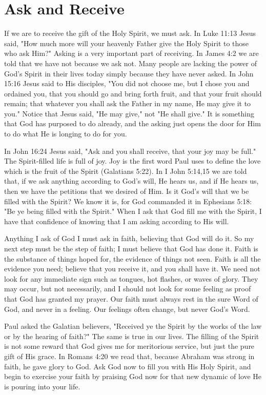 \section*{Ask and Receive}

If we are to receive the gift of the Holy Spirit, we must ask. In Luke 11:13 Jesus said, "How much more will your heavenly Father give the Holy Spirit to those who ask Him?" Asking is a very important part of receiving. In James 4:2 we are told that we have not because we ask not. Many people are lacking the power of God's Spirit in their lives today simply because they have never asked. In John 15:16 Jesus said to His disciples, "You did not choose me, but I chose you and ordained you, that you should go and bring forth fruit, and that your fruit should remain; that whatever you shall ask the Father in my name, He may give it to you." Notice that Jesus said, "He may give," not "He shall give." It is something that God has purposed to do already, and the asking just opens the door for Him to do what He is longing to do for you. 

In John 16:24 Jesus said, "Ask and you shall receive, that your joy may be full." The Spirit-filled life is full of joy. Joy is the first word Paul uses to define the love which is the fruit of the Spirit (Galatians 5:22). In I John 5:14,15 we are told that, if we ask anything according to God's will, He hears us, and if He hears us, then we have the petitions that we desired of Him. Is it God's will that we be filled with the Spirit? We know it is, for God commanded it in Ephesians 5:18: "Be ye being filled with the Spirit." When I ask that God fill me with the Spirit, I have that confidence of knowing that I am asking according to His will. 

Anything I ask of God I must ask in faith, believing that God will do it. So my next step must be the step of faith; I must believe that God has done it. Faith is the substance of things hoped for, the evidence of things not seen. Faith is all the evidence you need; believe that you receive it, and you shall have it. We need not look for any immediate sign such as tongues, hot flashes, or waves of glory. They may occur, but not necessarily, and I should not look for some feeling as proof that God has granted my prayer. Our faith must always rest in the sure Word of God, and never in a feeling. Our feelings often change, but never God's Word. 

Paul asked the Galatian believers, "Received ye the Spirit by the works of the law or by the hearing of faith?" The same is true in our lives. The filling of the Spirit is not some reward that God gives me for meritorious service, but just the pure gift of His grace. In Romans 4:20 we read that, because Abraham was strong in faith, he gave glory to God. Ask God now to fill you with His Holy Spirit, and begin to exercise your faith by praising God now for that new dynamic of love He is pouring into your life. 


